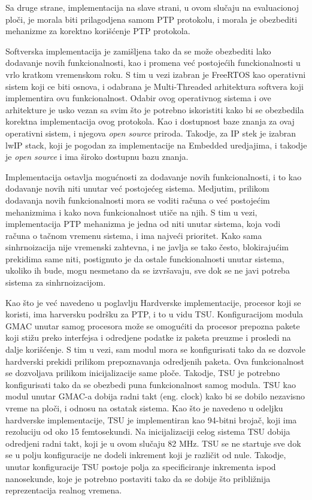 \documentclass[a4paper,12pt, master]{etf}
\begin{document}
    Sa druge strane, implementacija na slave strani, u ovom slu\v{c}aju na
	evaluacionoj plo\v{c}i, je morala biti prilagodjena samom PTP protokolu, i
	morala je obezbediti mehanizme za korektno kori\v{s}\'{c}enje PTP protokola.

	Softverska implementacija je zami\v{s}ljena tako da se mo\v{z}e obezbediti
	lako dodavanje novih funkcionalnosti, kao i promena ve\'{c} postoje\'{c}ih
	funckionalnosti u vrlo kratkom vremenskom roku. S tim u vezi izabran je
	FreeRTOS kao operativni sistem koji ce biti osnova, i odabrana je
	Multi-Threaded arhitektura softvera koji implementira ovu funkcionalnost.
	Odabir ovog operativnog sistema i ove arhitekture je usko vezan sa svim
	\v{s}to je potrebno iskoristiti kako bi se obezbedila korektna
	implementacija ovog protokola. Kao i dostupnost baze znanja za ovaj
	operativni sistem, i njegova \textit{open source} priroda. Takodje, za IP
    stek je izabran lwIP stack, koji je pogodan za implementacije na Embedded
	uredjajima, i takodje je \textit{open source} i ima \v{s}iroko dostupnu bazu
    znanja.

	Implementacija ostavlja mogu\'{c}nosti za dodavanje novih funkcionalnosti,
	i to kao dodavanje novih niti unutar ve\'{c} postoje\'{c}eg sistema.
	Medjutim, prilikom dodavanja novih funkcionalnosti mora se voditi
	ra\v{c}una o ve\'{c} postoje\'{c}im mehanizmima i kako nova funkcionalnost
	uti\v{c}e na njih. S tim u vezi, implementacija PTP mehanizma je jedna od
	niti unutar sistema, koja vodi ra\v{c}una o ta\v{c}nom vremenu sistema, i
	ima najve\'{c}i prioritet. Kako sama sinhrnoizacija nije vremenski zahtevna,
	 i ne javlja se tako \v{c}esto, blokiraju\'{c}im prekidima same niti,
	postignuto je da ostale funckionalnosti unutar sistema, ukoliko ih bude,
	mogu nesmetano da se izvr\v{s}avaju, sve dok se ne javi potreba sistema za
	sinhrnoizacijom.

	Kao \v{s}to je ve\'{c} navedeno u poglavlju Hardverske implementacije,
	procesor koji se koristi, ima harversku podr\v{s}ku za PTP, i to u vidu TSU.
    Konfiguracijom modula GMAC unutar samog procesora
	mo\v{z}e se omogu\'{c}iti da procesor prepozna pakete koji sti\v{z}u preko
	interfejsa i odredjene podatke iz paketa preuzme i prosledi na dalje
	kori\v{s}\'{c}enje. S tim u vezi, sam modul mora se konfigurisati tako da
	se dozvole hardverski prekidi prilikom prepoznavanja odredjenih paketa. Ova
	funkcionalnost se dozvoljava prilikom inicijalizacije same plo\v{c}e.
	Takodje, TSU je potrebno konfigurisati tako da se obezbedi puna
    funkcionalnost samog modula. TSU kao modul unutar GMAC-a dobija radni takt
    (eng\@. clock) kako bi se dobilo nezavisno vreme na plo\v{c}i, i odnosu na
    ostatak sistema. Kao \v{s}to je navedeno u odeljku hardverske
    implementacije, TSU je implementiran kao 94-bitni broja\v{c}, koji ima
	rezoluciju od oko 15 femtosekundi. Na inicijalizaciji celog sistema TSU
	dobija odredjeni radni takt, koji je u ovom slu\v{c}aju 82 MHz. TSU se ne
    startuje sve dok se u polju konfiguracije ne dodeli inkrement koji je
    razli\v{c}it od nule. Takodje, unutar konfiguracije TSU postoje polja za
    specificiranje inkrementa ispod nanosekunde, koje je potrebno postaviti tako
    da se dobije \v{s}to pribli\v{z}nija reprezentacija realnog vremena.
\end{document}
